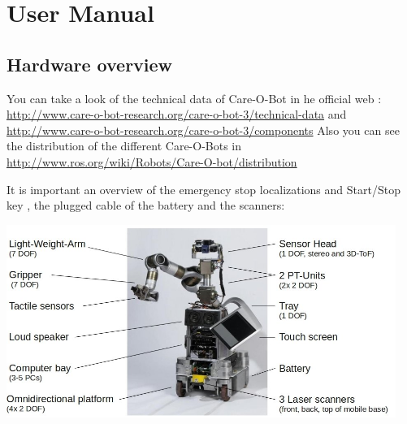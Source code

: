 \chapter{User Manual}      
\section{Hardware overview}
You can take a look of the technical data of Care-O-Bot in he official web : \url{http://www.care-o-bot-research.org/care-o-bot-3/technical-data} and \url{http://www.care-o-bot-research.org/care-o-bot-3/components}
Also you can see the distribution of the different Care-O-Bots in 
\\ \url{http://www.ros.org/wiki/Robots/Care-O-bot/distribution}

It is important an overview of the emergency stop localizations and Start/Stop key , the plugged cable of the battery and the scanners: 
\begin{center}
 \includegraphics[width=0.95\textwidth]{images/hardware_overview.jpg}
 \end{center}


